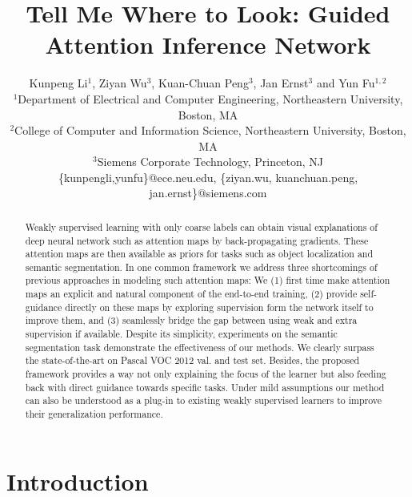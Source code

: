 \documentclass[10pt,twocolumn,letterpaper]{article}
\begin{document}
\title{Tell Me Where to Look: Guided Attention Inference Network}

\author{
   Kunpeng Li$^{1}$, Ziyan Wu$^{3}$, Kuan-Chuan Peng$^{3}$, Jan Ernst$^{3}$ and Yun Fu$^{1,2}$\\
   $^1$Department of Electrical and Computer Engineering, Northeastern University, Boston, MA\\
   $^2$College of Computer and Information Science, Northeastern University, Boston, MA\\
   $^3$Siemens Corporate Technology, Princeton, NJ\\
   \small{\{kunpengli,yunfu\}@ece.neu.edu, \{ziyan.wu, kuanchuan.peng, jan.ernst\}@siemens.com}
}


\maketitle

\begin{abstract}



Weakly supervised learning with only coarse labels can obtain visual explanations of deep neural network such as attention maps by back-propagating gradients. These attention maps are then available as priors for tasks such as object localization and semantic segmentation. In one common framework we address three shortcomings of previous approaches in modeling such attention maps: We (1) first time make attention maps an explicit and natural component of the end-to-end training, (2) provide self-guidance directly on these maps by exploring supervision form the network itself to improve them, and (3) seamlessly bridge the gap between using weak and extra supervision if available. Despite its simplicity, experiments on the semantic segmentation task demonstrate the effectiveness of our methods. We clearly surpass the state-of-the-art on Pascal VOC 2012 val. and test set. Besides, the proposed framework provides a way not only explaining the focus of the learner but also feeding back with direct guidance towards specific tasks. Under mild assumptions our method can also be understood as a plug-in to existing weakly supervised learners to improve their generalization performance.






\end{abstract}

\section{Introduction}\label{sc:intro}
\end{document}
